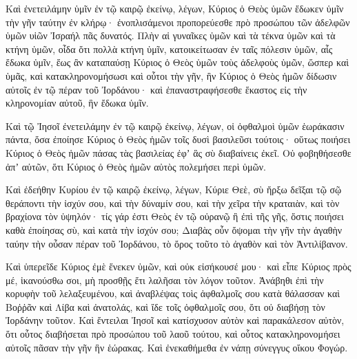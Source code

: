 {\par }{\PP {}Καὶ ἐνετειλάμην ὑμῖν ἐν τῷ καιρῷ ἐκείνῳ, λέγων, Κύριος ὁ Θεὸς ὑμῶν ἔδωκεν ὑμῖν τὴν γῆν ταύτην ἐν κλήρῳ· ἐνοπλισάμενοι προπορεύεσθε πρὸ προσώπου τῶν ἀδελφῶν ὑμῶν υἱῶν Ἰσραήλ πᾶς δυνατός.
Πλὴν αἱ γυναῖκες ὑμῶν καὶ τὰ τέκνα ὑμῶν καὶ τὰ κτήνη ὑμῶν, οἶδα ὅτι πολλὰ κτήνη ὑμῖν, κατοικείτωσαν ἐν ταῖς πόλεσιν ὑμῶν, αἷς ἔδωκα ὑμῖν, ἕως ἂν καταπαύσῃ Κύριος ὁ
Θεὸς ὑμῶν τοὺς ἀδελφοὺς ὑμῶν, ὥσπερ καὶ ὑμᾶς, καὶ κατακληρονομήσωσι καὶ οὗτοι τὴν γῆν, ἣν Κύριος ὁ Θεὸς ἡμῶν δίδωσιν αὐτοῖς ἐν τῷ πέραν τοῦ Ἰορδάνου· καὶ ἐπαναστραφήσεσθε ἕκαστος εἰς τὴν κληρονομίαν αὐτοῦ, ἣν ἔδωκα ὑμῖν.
\par }{\PP {}Καὶ τῷ Ἰησοῖ ἐνετειλάμην ἐν τῷ καιρῷ ἐκείνῳ, λέγων, οἱ ὀφθαλμοὶ ὑμῶν ἑωράκασιν πάντα, ὅσα ἐποίησε Κύριος ὁ Θεὸς ἡμῶν τοῖς δυσὶ βασιλεῦσι τούτοις· οὕτως ποιήσει Κύριος ὁ Θεὸς ἡμῶν πάσας τὰς βασιλείας ἐφʼ ἃς σὺ διαβαίνεις ἐκεῖ.
Οὐ φοβηθήσεσθε ἀπʼ αὐτῶν, ὅτι Κύριος ὁ Θεὸς ἡμῶν αὐτὸς πολεμήσει περὶ ὑμῶν.
\par }{\PP {}Καὶ ἐδεήθην Κυρίου ἐν τῷ καιρῷ ἐκείνῳ, λέγων,
Κύριε Θεὲ, σὺ ἤρξω δεῖξαι τῷ σῷ θεράποντι τὴν ἰσχύν σου, καὶ τὴν δύναμίν σου, καὶ τὴν χεῖρα τὴν κραταιὰν, καὶ τὸν βραχίονα τὸν ὑψηλόν· τίς γάρ ἐστι Θεὸς ἐν τῷ οὐρανῷ ἢ ἐπὶ τῆς γῆς, ὅστις ποιήσει καθὰ ἐποίησας σὺ, καὶ κατὰ τὴν ἰσχύν σου;
Διαβὰς οὖν ὄψομαι τὴν γῆν τὴν ἀγαθὴν ταύην τὴν οὖσαν πέραν τοῦ Ἰορδάνου, τὸ ὄρος τοῦτο τὸ ἀγαθὸν καὶ τὸν Ἀντιλίβανον.
\par }{\PP {}Καὶ ὑπερεῖδε Κύριος ἐμὲ ἕνεκεν ὑμῶν, καὶ οὐκ εἰσήκουσέ μου· καὶ εἶπε Κύριος πρὸς μέ, ἱκανούσθω σοι, μὴ προσθῇς ἔτι λαλῆσαι τὸν λόγον τοῦτον.
Ἀνάβηθι ἐπὶ τὴν κορυφὴν τοῦ λελαξευμένου, καὶ ἀναβλέψας τοὶς ἀφθαλμοῖς σου κατὰ θάλασσαν καὶ Βοῤῥᾶν καὶ Λίβα καὶ ἀνατολάς, καὶ ἴδε τοῖς ὀφθαλμοῖς σου, ὅτι οὐ διαβήσῃ τὸν Ἰορδάνην τοῦτον.
Καὶ ἔντειλαι Ἰησοῖ καὶ κατίσχυσον αὐτὸν καὶ παρακάλεσον αὐτὸν, ὅτι οὗτος διαβήσεται πρὸ προσώπου τοῦ λαοῦ τούτου, καὶ οὗτος κατακληρονομήσει αὐτοῖς πᾶσαν τὴν γῆν ἣν ἑώρακας.
Καὶ ἐνεκαθήμεθα ἐν νάπῃ σύνεγγυς οἴκου Φογώρ.

}
